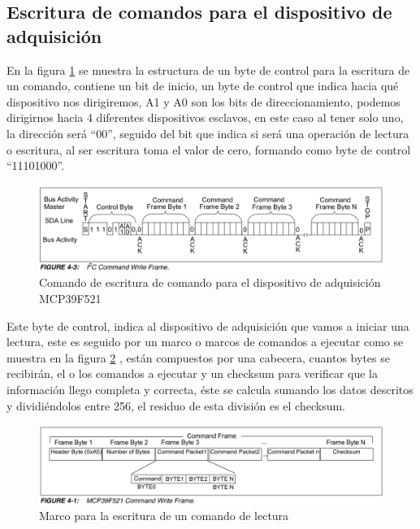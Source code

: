 \subsection{Escritura de comandos para el dispositivo de adquisición}

En la figura \ref{fig:Comando de escritura} se muestra la estructura de un byte de control para la escritura de un comando, contiene un bit de inicio, un byte de control que indica hacia qué dispositivo nos dirigiremos, A1 y A0 son los bits de direccionamiento, podemos dirigirnos hacia 4 diferentes dispositivos esclavos, en este caso al tener solo uno, la dirección será “00”, seguido del bit que indica si será una operación de lectura o escritura, al ser escritura toma el valor de cero, formando como byte de control “11101000”.

\begin{figure}[H]
	\centering
	\includegraphics[scale=.4]{Capitulo5/images/write_command.png}
	\caption{Comando de escritura de comando para el dispositivo de adquisición MCP39F521}
	\label{fig:Comando de escritura}
\end{figure}

Este byte de control, indica al dispositivo de adquisición que vamos a iniciar una lectura, este es seguido por un marco o marcos de comandos a ejecutar como se muestra en la figura \ref{fig:Marco de escritura de lectura} , están compuestos por una cabecera, cuantos bytes se recibirán, el o los comandos a ejecutar y un checksum para verificar que la información llego completa y correcta, éste se calcula sumando los datos descritos y dividiéndolos entre 256, el residuo de esta división es el checksum.

\begin{figure}[H]
	\centering
	\includegraphics[scale=.4]{Capitulo5/images/marco_write_command.png}
	\caption{Marco para la escritura de un comando de lectura}
	\label{fig:Marco de escritura de lectura}
\end{figure}

